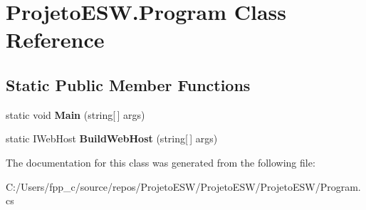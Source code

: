 \hypertarget{class_projeto_e_s_w_1_1_program}{}\section{Projeto\+E\+S\+W.\+Program Class Reference}
\label{class_projeto_e_s_w_1_1_program}
\subsection*{Static Public Member Functions}
\begin{DoxyCompactItemize}
\item 
\mbox{\label{class_projeto_e_s_w_1_1_program_a6ba6ef4a938a2af02d0f5d3d8f343aa1}} 
static void {\bfseries Main} (string\mbox{[}$\,$\mbox{]} args)
\item 
\mbox{\label{class_projeto_e_s_w_1_1_program_a42c712296e83b532aad9736ec57f695f}} 
static I\+Web\+Host {\bfseries Build\+Web\+Host} (string\mbox{[}$\,$\mbox{]} args)
\end{DoxyCompactItemize}


The documentation for this class was generated from the following file\+:\begin{DoxyCompactItemize}
\item 
C\+:/\+Users/fpp\+\_\+c/source/repos/\+Projeto\+E\+S\+W/\+Projeto\+E\+S\+W/\+Projeto\+E\+S\+W/Program.\+cs\end{DoxyCompactItemize}
